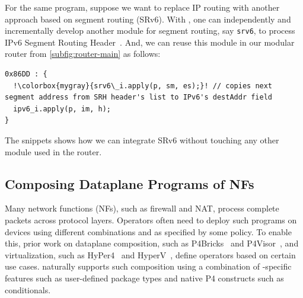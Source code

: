 \documentclass[letterpaper,twocolumn,10pt]{article}
\begin{document}


%
For the same program, suppose we want to replace IP routing with
another approach based on segment routing (SRv6). With \ulang, one can
independently and incrementally develop another module for segment
routing, say \texttt{srv6}, to process IPv6 Segment Routing
Header~\cite{srh}. And, we can reuse this module in our modular router
from \cref{subfig:router-main} as follows:

\begin{lstlisting}[frame=none, escapechar=!]
0x86DD : {
  !\colorbox{mygray}{srv6\_i.apply(p, sm, es);}! // copies next segment address from SRH header's list to IPv6's destAddr field
  ipv6_i.apply(p, im, h);
}
\end{lstlisting}
The snippets shows how we can integrate SRv6 without touching any
other module used in the router.




\subsection{Composing Dataplane Programs of NFs}
\label{subsection:composing-dataplane-programs-of-NFs}

Many network functions (NFs), such as firewall and NAT, process
complete packets across protocol layers. Operators often need to
deploy such programs on devices using different combinations and as
specified by some policy. To enable this, prior work on dataplane
composition, such as P4Bricks~\cite{soni:hal-01632431} and
P4Visor~\cite{Zheng:2018:PLV:3281411.3281436}, and virtualization,
such as HyPer4~\cite{Hancock:2016:HUP:2999572.2999607} and
HyperV~\cite{8038396}, define operators based on certain use cases.
\ulang naturally supports such composition using a combination of
\ulang-specific features such as user-defined package types and native
P4 constructs such as conditionals.
\end{document}
